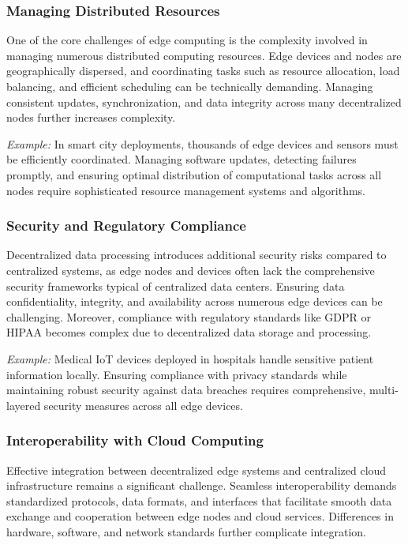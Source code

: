 \documentclass[runningheads]{llncs}
\begin{document}
\subsubsection{Managing Distributed Resources}
One of the core challenges of edge computing is the complexity involved in managing numerous distributed computing resources. Edge devices and nodes are geographically dispersed, and coordinating tasks such as resource allocation, load balancing, and efficient scheduling can be technically demanding. Managing consistent updates, synchronization, and data integrity across many decentralized nodes further increases complexity.

\textit{Example:} In smart city deployments, thousands of edge devices and sensors must be efficiently coordinated. Managing software updates, detecting failures promptly, and ensuring optimal distribution of computational tasks across all nodes require sophisticated resource management systems and algorithms.

\subsubsection{Security and Regulatory Compliance}
Decentralized data processing introduces additional security risks compared to centralized systems, as edge nodes and devices often lack the comprehensive security frameworks typical of centralized data centers. Ensuring data confidentiality, integrity, and availability across numerous edge devices can be challenging. Moreover, compliance with regulatory standards like GDPR or HIPAA becomes complex due to decentralized data storage and processing.

\textit{Example:} Medical IoT devices deployed in hospitals handle sensitive patient information locally. Ensuring compliance with privacy standards while maintaining robust security against data breaches requires comprehensive, multi-layered security measures across all edge devices.

\subsubsection{Interoperability with Cloud Computing}
Effective integration between decentralized edge systems and centralized cloud infrastructure remains a significant challenge. Seamless interoperability demands standardized protocols, data formats, and interfaces that facilitate smooth data exchange and cooperation between edge nodes and cloud services. Differences in hardware, software, and network standards further complicate integration.
\end{document}
